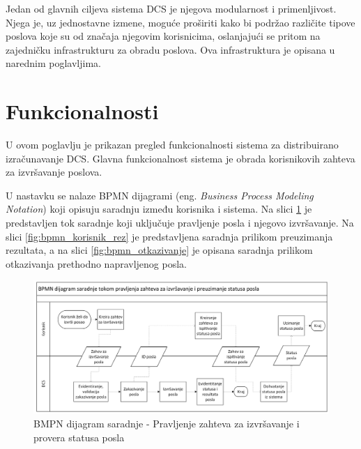 \documentclass[12pt,oneside]{memoir}
\begin{document}

Jedan od glavnih ciljeva sistema DCS je njegova modularnost i primenljivost. Njega je, uz jednostavne izmene, moguće proširiti kako bi podržao različite tipove poslova koje su od značaja njegovim korisnicima, oslanjajući se pritom na zajedničku infrastrukturu za obradu poslova. Ova infrastruktura je opisana u narednim poglavljima.


\section{Funkcionalnosti}
\label{chp:opisfunkc}


U ovom poglavlju je prikazan pregled funkcionalnosti sistema za distribuirano izračunavanje DCS. 
Glavna funkcionalnost sistema je obrada korisnikovih zahteva za izvršavanje poslova. 

U nastavku se nalaze BPMN dijagrami (eng. \emph{Business Process Modeling Notation}) koji opisuju saradnju između korisnika i sistema. Na slici \ref{fig:bpmn_korisnik} je predstavljen tok saradnje koji uključuje pravljenje posla i njegovo izvršavanje.  Na slici \ref{fig:bpmn_korisnik_rez} je predstavljena saradnja prilikom preuzimanja rezultata, a na slici \ref{fig:bpmn_otkazivanje} je opisana saradnja prilikom otkazivanja prethodno napravljenog posla.

\begin{figure}[!ht]
  \centering
  \includegraphics[width=1\textwidth]{./images/BPMN_dijagram_saradnje_korisnik_dsc.png}
  \caption{BMPN dijagram saradnje - Pravljenje zahteva za izvršavanje i provera statusa posla}
  \label{fig:bpmn_korisnik}
\end{figure}
\end{document}
